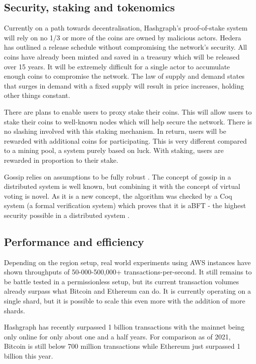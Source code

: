 \subsection{Security, staking and tokenomics}
Currently on a path towards decentralisation, Hashgraph's proof-of-stake system will rely on no 1/3 or more of the coins are owned by malicious actors. Hedera has outlined a release schedule without compromising the network's security. All coins have already been minted and saved in a treasury which will be released over 15 years\cite{economics2020hedera}. It will be extremely difficult for a single actor to accumulate enough coins to compromise the network. The law of supply and demand states that surges in demand with a fixed supply will result in price increases, holding other things constant.

There are plans to enable users to proxy stake their coins. This will allow users to stake their coins to well-known nodes which will help secure the network\cite{madsen2019hedera}. There is no slashing involved with this staking mechanism. In return, users will be rewarded with additional coins for participating. This is very different compared to a mining pool, a system purely based on luck. With staking, users are rewarded in proportion to their stake.

Gossip relies on assumptions to be fully robust \cite{alvisi}. The concept of gossip in a distributed system is well known, but combining it with the concept of virtual voting is novel. As it is a new concept, the algorithm was checked by a Coq system (a formal verification system) which proves that it is aBFT - the highest security possible in a distributed system \cite{coq2018}.


\subsection{Performance and efficiency}

Depending on the region setup, real world experiments using AWS instances have shown throughputs of 50-000-500,000+ transactions-per-second\cite{baird2018hedera}. It still remains to be battle tested in a permissionless setup, but its current transaction volumes\cite{hederadashboard} already surpass what Bitcoin and Ethereum can do. It is currently operating on a single shard, but it is possible to scale this even more with the addition of more shards.

Hashgraph has recently surpassed 1 billion transactions with the mainnet being only online for only about one and a half years\cite{kunz2021hedera}. For comparison as of 2021, Bitcoin\cite{btctxn} is still below 700 million transactions while Ethereum\cite{ethtxn} just surpassed 1 billion this year.

